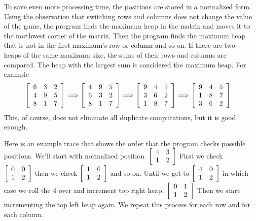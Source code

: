 \documentclass[11pt]{article}
\begin{document}
To save even more processing time, the positions are stored in a normalized form.  Using the observation that switching rows and columns does not change the value of the game, the program finds the maximum heap in the matrix and moves it to the northwest corner of the matrix.  Then the program finds the maximum heap that is not in the first maximum's row or column and so on.  If there are two heaps of the same maximum size, the sums of their rows and columns are compared.  The heap with the largest sum is considered the maximum heap. For example
$$
\left[
\begin{array}{ c c c}
6 & 3 & 2 \\
4 & 9 & 5 \\
8 & 1 & 7
\end{array}
\right]
\Longrightarrow
\left[
\begin{array}{ c c c}
4 & 9 & 5 \\
6 & 3 & 2 \\
8 & 1 & 7
\end{array}
\right]
\Longrightarrow
\left[
\begin{array}{ c c c}
9 & 4 & 5 \\
3 & 6 & 2 \\
1 & 8 & 7
\end{array}
\right]
\Longrightarrow
\left[
\begin{array}{ c c c }
9 & 4 & 5 \\
1 & 8 & 7 \\
3 & 6 & 2
\end{array}
\right]
$$
This, of course, does not eliminate all duplicate computations, but it is good enough.

Here is an example trace that shows the order that the program checks possible positions.  We'll start with normalized position.
$
\left[
\begin{array}{ c c }
4 & 3 \\
1 & 2
\end{array}
\right]
$
First we check
$
\left[
\begin{array}{ c c }
0 & 0 \\
1 & 2
\end{array}
\right]
$
then we check 
$
\left[
\begin{array}{ c c }
1 & 0 \\
1 & 2
\end{array}
\right]
$
and so on. Until we get to
$
\left[
\begin{array}{ c c }
4 & 0 \\
1 & 2
\end{array}
\right]
$
in which case we roll the 4 over and increment top right heap.
$
\left[
\begin{array}{ c c }
0 & 1 \\
1 & 2
\end{array}
\right]
$
Then we start incrementing the top left heap again.  We repeat this process for each row and for each column.
\end{document}

